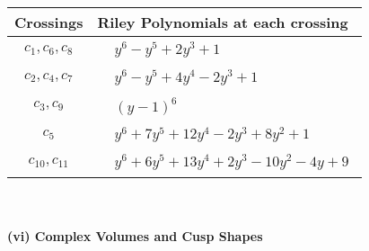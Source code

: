 \documentclass[1p]{elsarticle_modified}
\theoremstyle{definition}
\begin{document}
\begin{tabular}{m{50pt}|m{274pt}}
Crossings & \hspace{64pt}Riley Polynomials at each crossing \\
\hline $$\begin{aligned}c_{1},c_{6},c_{8}\end{aligned}$$&$\begin{aligned}
&y^6- y^5+2 y^3+1
\end{aligned}$\\
\hline $$\begin{aligned}c_{2},c_{4},c_{7}\end{aligned}$$&$\begin{aligned}
&y^6- y^5+4 y^4-2 y^3+1
\end{aligned}$\\
\hline $$\begin{aligned}c_{3},c_{9}\end{aligned}$$&$\begin{aligned}
&(y-1)^6
\end{aligned}$\\
\hline $$\begin{aligned}c_{5}\end{aligned}$$&$\begin{aligned}
&y^6+7 y^5+12 y^4-2 y^3+8 y^2+1
\end{aligned}$\\
\hline $$\begin{aligned}c_{10},c_{11}\end{aligned}$$&$\begin{aligned}
&y^6+6 y^5+13 y^4+2 y^3-10 y^2-4 y+9
\end{aligned}$\\
\hline
\end{tabular}\\~\\
\newpage\flushleft \textbf{(vi) Complex Volumes and Cusp Shapes}
\end{document}
